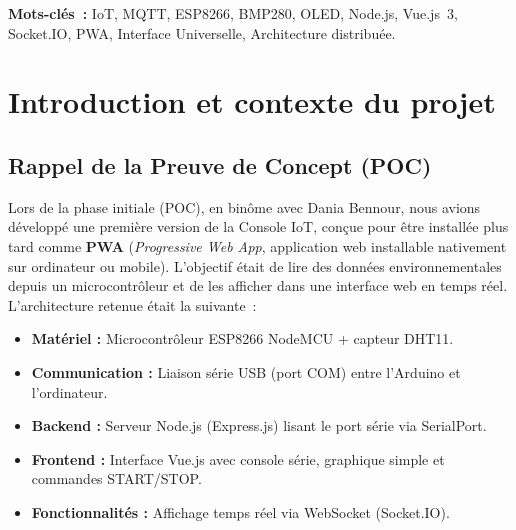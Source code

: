 \documentclass[12pt, a4paper]{report}
\begin{document}
\vspace{0.5cm}
\noindent\textbf{\textcolor{bleuFonce}{Mots-cl\'es~:}}
IoT, MQTT, ESP8266, BMP280, OLED, Node.js, Vue.js~3, Socket.IO,
PWA, Interface Universelle, Architecture distribu\'ee.

\tableofcontents
{}
\listoffigures
{}
\listoftables
{}

\clearpage
{}
\setcounter{page}{1}

\chapter{Introduction et contexte du projet}

\section{Rappel de la Preuve de Concept (POC)}

Lors de la phase initiale (POC), en bin\^ome avec Dania Bennour, nous
avions d\'evelopp\'e une premi\`ere version de la Console IoT, con\c{c}ue
pour \^etre install\'ee plus tard comme \textbf{PWA} (\textit{Progressive
Web App}, application web installable nativement sur ordinateur ou
mobile).
L'objectif \'etait de lire des donn\'ees environnementales depuis un
microcontr\^oleur et de les afficher dans une interface web en temps
r\'eel. L'architecture retenue \'etait la suivante~:

\begin{itemize}[leftmargin=1.5cm, itemsep=4pt]
  \item \textbf{Mat\'eriel :} Microcontr\^oleur ESP8266 NodeMCU +
        capteur DHT11.
  \item \textbf{Communication :} Liaison s\'erie USB (port COM) entre
        l'Arduino et l'ordinateur.
  \item \textbf{Backend :} Serveur Node.js (Express.js) lisant le port
        s\'erie via SerialPort.
  \item \textbf{Frontend :} Interface Vue.js avec console s\'erie,
        graphique simple et commandes START/STOP.
  \item \textbf{Fonctionnalit\'es :} Affichage temps r\'eel via
        WebSocket (Socket.IO).
\end{itemize}
\end{document}
